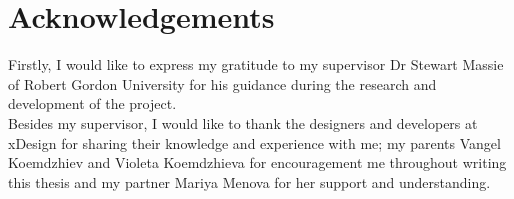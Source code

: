 \chapter{Acknowledgements}
Firstly, I would like to express my gratitude to my supervisor Dr Stewart Massie of Robert Gordon University for his guidance during the research and development of the project. \\

\noindent Besides my supervisor, I would like to thank the designers and developers at xDesign for sharing their knowledge and experience with me; my parents Vangel Koemdzhiev and Violeta Koemdzhieva for encouragement me throughout writing this thesis and my partner Mariya Menova for her support and understanding.
